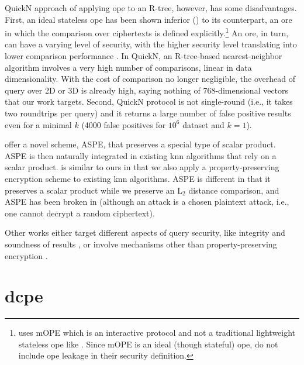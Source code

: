 			QuickN approach of applying \acrshort{ope} to an R-tree, however, has some disadvantages.
			First, an ideal stateless \acrshort{ope} has been shown inferior (\cite{ope-leakage}) to its counterpart, an \acrfull{ore} in which the comparison over ciphertexts is defined explicitly.\footnote{
				\cite{quick-n} uses mOPE \cite{ope-ideal-security-protocol} which is an interactive protocol and not a traditional lightweight stateless \acrshort{ope} like \cite{bclo-ope}.
				Since mOPE is an ideal (though stateful) \acrshort{ope}, \cite{quick-n} do not include \acrshort{ope} leakage in their security definition.
			}
			An \acrshort{ore}, in turn, can have a varying level of security, with the higher security level translating into lower comparison performance \cite{ore-benchmark-17}.
			In QuickN, an R-tree-based nearest-neighbor algorithm involves a very high number of comparisons, linear in data dimensionality.
			With the cost of comparison no longer negligible, the overhead of query over 2D or 3D is already high, saying nothing of 768-dimensional vectors that our work targets.
			Second, QuickN protocol is not single-round (i.e., it takes two roundtrips per query) and it returns a large number of false positive results even for a minimal $k$ (\num{4000} false positives for $10^6$ dataset and $k = 1$).

			\textcite{knn-aspe} offer a novel scheme, ASPE, that preserves a special type of scalar product.
			ASPE is then naturally integrated in existing \acrshort{knn} algorithms that rely on a scalar product.
			\cite{knn-aspe} is similar to ours in that we also apply a property-preserving encryption scheme to existing \acrshort{knn} algorithms.
			ASPE is different in that it preserves a scalar product while we preserve an $\text{L}_2$ distance comparison, and ASPE has been broken in \cite{secure-nn-revisited-break-aspe} (although an attack is a chosen plaintext attack, i.e., one cannot decrypt a random ciphertext).

			Other works either target different aspects of query security, like integrity and soundness of results \cite{knn-integrity-soundness,svknn}, or involve mechanisms other than property-preserving encryption \cite{seceqp,practical-approx-knn,knn-sharing-keys,knn-mult-data-owners,knn-over-encrypted,knn-paillier,knn-blind,knn-homomorphism,knn-strong-location-privacy,knn-no-anonymizers,knn-efficient,knn-new-casper}.

	\section{\texorpdfstring{\acrlong{dcpe}}{Distance Comparison Preserving Encryption}}

